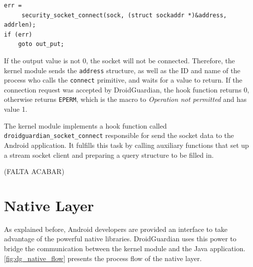 \begin{lstlisting}[style=CInputStyle, caption=\texttt{security\_socket\_connect} hook (Linux kernel v3.11), label=lst:security_socket_connect]
err =
	 security_socket_connect(sock, (struct sockaddr *)&address, addrlen);
if (err)
	goto out_put;
\end{lstlisting}

If the output value is not 0, the socket will not be connected. Therefore, the kernel module sends the \texttt{address} structure, as well as the ID and name of the process who calls the \texttt{connect} primitive, and waits for a value to return. If the connection request was accepted by DroidGuardian, the hook function returns 0, otherwise returns \texttt{EPERM}, which is the macro to \textit{Operation not permitted} and has value 1.

The kernel module implements a hook function called \texttt{droidguardian\_socket\_connect} responsible for send the socket data to the Android application. It fulfills this task by calling auxiliary functions that set up a stream socket client and preparing a query structure to be filled in.

(FALTA ACABAR)


\section{Native Layer}

As explained before, Android developers are provided an interface to take advantage of the powerful native libraries. DroidGuardian uses this power to bridge the communication between the kernel module and the Java application. \autoref{fig:dg_native_flow} presents the process flow of the native layer.

